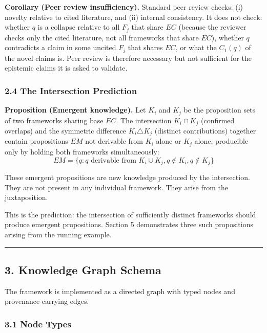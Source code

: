 \documentclass[
]{article}
\begin{document}
\textbf{Corollary (Peer review insufficiency).} Standard peer review
checks: (i) novelty relative to cited literature, and (ii) internal
consistency. It does not check: whether \(q\) is a collapse relative to
all \(F_j\) that share \(EC\) (because the reviewer checks only the
cited literature, not all frameworks that share \(EC\)), whether \(q\)
contradicts a claim in some uncited \(F_j\) that shares \(EC\), or what
the \(C_1(q)\) of the novel claims is. Peer review is therefore
necessary but not sufficient for the epistemic claims it is asked to
validate.

\subsubsection{2.4 The Intersection
Prediction}\label{the-intersection-prediction}

\textbf{Proposition (Emergent knowledge).} Let \(K_i\) and \(K_j\) be
the proposition sets of two frameworks sharing base \(EC\). The
intersection \(K_i \cap K_j\) (confirmed overlaps) and the symmetric
difference \(K_i \triangle K_j\) (distinct contributions) together
contain propositions \(EM\) not derivable from \(K_i\) alone or \(K_j\)
alone, producible only by holding both frameworks simultaneously:
\[EM = \{q : q \text{ derivable from } K_i \cup K_j, q \notin K_i, q \notin K_j\}\]

These emergent propositions are new knowledge produced by the
intersection. They are not present in any individual framework. They
arise from the juxtaposition.

This is the prediction: the intersection of sufficiently distinct
frameworks should produce emergent propositions. Section 5 demonstrates
three such propositions arising from the running example.

\begin{center}\rule{0.5\linewidth}{0.5pt}\end{center}

\subsection{3. Knowledge Graph Schema}\label{knowledge-graph-schema}

The framework is implemented as a directed graph with typed nodes and
provenance-carrying edges.

\subsubsection{3.1 Node Types}\label{node-types}
\end{document}
